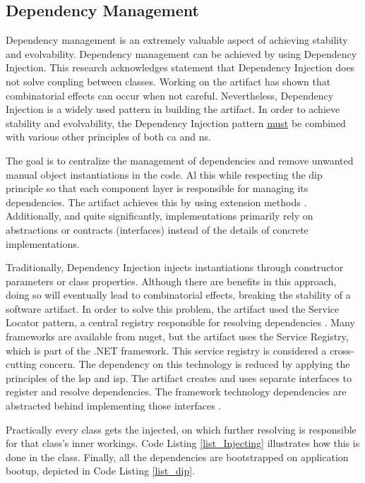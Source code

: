 \subsection{Dependency Management}

Dependency management is an extremely valuable aspect of achieving stability and
evolvability. Dependency management can be achieved by using Dependency Injection. This
research acknowledges \textcite[215]{mannaert_normalized_2016} statement that Dependency
Injection does not solve coupling between classes. Working on the artifact has shown that
combinatorial effects can occur when not careful. Nevertheless, Dependency Injection is a
widely used pattern in building the artifact. In order to achieve stability and
evolvability, the Dependency Injection pattern \underline{must} be combined with various
other principles of both \gls{ca} and \gls{ns}. 

The goal is to centralize the management of dependencies and remove unwanted manual object
instantiations in the code. Al this while respecting the \gls{dip} principle so that each
component layer is responsible for managing its dependencies. The artifact achieves this
by using extension methods \parencite{koks_dependencyinjectionextension_2023}. Additionally, and quite significantly,
implementations primarily rely on abstractions or contracts (interfaces) instead of the
details of concrete implementations. 

Traditionally, Dependency Injection injects instantiations through constructor parameters
or class properties. Although there are benefits in this approach, doing so will
eventually lead to combinatorial effects, breaking the stability of a software artifact.
In order to solve this problem, the artifact used the Service Locator pattern, a central
registry responsible for resolving dependencies \parencite{wikipedia_service_2023}. Many
frameworks are available from \gls{nuget}, but the artifact uses the Service Registry,
which is part of the .NET framework. This service registry is considered a cross-cutting
concern. The dependency on this technology is reduced by applying the principles of the
\gls{lsp} and \gls{isp}. The artifact creates and uses separate interfaces to register
\parencite{koks_idependencymanagerinteractor_2023} and resolve
\parencite{koks_idependencyfactoryinteractor_2023} dependencies. The framework technology
dependencies are abstracted behind implementing those interfaces
\parencite{koks_dependencymanagerinteractor_2023}. 

Practically every class gets the 
injected, on which further resolving is responsible for that class's inner workings. Code
Listing \ref{list_Injecting} illustrates how this is done in the
 class. Finally, all the dependencies are
bootstrapped on application bootup, depicted in Code Listing \ref{list_dip}. 


